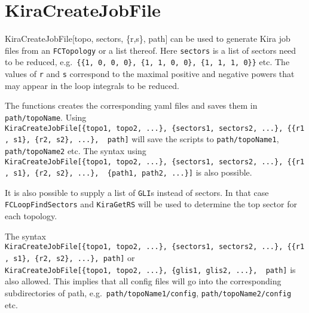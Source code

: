\documentclass[../FeynHelpersManual.tex]{subfiles}
\begin{document}
\hypertarget{kiracreatejobfile}{
\section{KiraCreateJobFile}\label{kiracreatejobfile}}

KiraCreateJobFile{[}topo, sectors, \{r,s\}, path{]} can be used to
generate Kira job files from an \texttt{FCTopology} or a list thereof.
Here \texttt{sectors} is a list of sectors need to be reduced,
e.g.~\texttt{\{\allowbreak{}\{\allowbreak{}1,\ \allowbreak{}0,\ \allowbreak{}0,\ \allowbreak{}0\},\ \allowbreak{}\{\allowbreak{}1,\ \allowbreak{}1,\ \allowbreak{}0,\ \allowbreak{}0\},\ \allowbreak{}\{\allowbreak{}1,\ \allowbreak{}1,\ \allowbreak{}1,\ \allowbreak{}0\}\}}
etc. The values of \texttt{r} and \texttt{s} correspond to the maximal
positive and negative powers that may appear in the loop integrals to be
reduced.

The functions creates the corresponding yaml files and saves them in
\texttt{path/topoName}. Using
\texttt{KiraCreateJobFile[\allowbreak{}\{\allowbreak{}topo1,\ \allowbreak{}topo2,\ \allowbreak{}...\},\ \allowbreak{}\{\allowbreak{}sectors1,\ \allowbreak{}sectors2,\ \allowbreak{}...\},\ \allowbreak{}\{\allowbreak{}\{\allowbreak{}r1,\ \allowbreak{}s1\},\ \allowbreak{}\{\allowbreak{}r2,\ \allowbreak{}s2\},\ \allowbreak{}...\},\ \allowbreak{} path]}
will save the scripts to \texttt{path/topoName1},
\texttt{path/topoName2} etc. The syntax using
\texttt{KiraCreateJobFile[\allowbreak{}\{\allowbreak{}topo1,\ \allowbreak{}topo2,\ \allowbreak{}...\},\ \allowbreak{}\{\allowbreak{}sectors1,\ \allowbreak{}sectors2,\ \allowbreak{}...\},\ \allowbreak{}\{\allowbreak{}\{\allowbreak{}r1,\ \allowbreak{}s1\},\ \allowbreak{}\{\allowbreak{}r2,\ \allowbreak{}s2\},\ \allowbreak{}...\},\ \allowbreak{} \{\allowbreak{}path1,\ \allowbreak{}path2,\ \allowbreak{}...\}]}
is also possible.

It is also possible to supply a list of \texttt{GLI}s instead of
sectors. In that case \texttt{FCLoopFindSectors} and \texttt{KiraGetRS}
will be used to determine the top sector for each topology.

The syntax
\texttt{KiraCreateJobFile[\allowbreak{}\{\allowbreak{}topo1,\ \allowbreak{}topo2,\ \allowbreak{}...\},\ \allowbreak{}\{\allowbreak{}sectors1,\ \allowbreak{}sectors2,\ \allowbreak{}...\},\ \allowbreak{}\{\allowbreak{}\{\allowbreak{}r1,\ \allowbreak{}s1\},\ \allowbreak{}\{\allowbreak{}r2,\ \allowbreak{}s2\},\ \allowbreak{}...\},\ \allowbreak{}path]}
or
\texttt{KiraCreateJobFile[\allowbreak{}\{\allowbreak{}topo1,\ \allowbreak{}topo2,\ \allowbreak{}...\},\ \allowbreak{}\{\allowbreak{}glis1,\ \allowbreak{}glis2,\ \allowbreak{}...\},\ \allowbreak{} path]}
is also allowed. This implies that all config files will go into the
corresponding subdirectories of path,
e.g.~\texttt{path/topoName1/config}, \texttt{path/topoName2/config} etc.
\end{document}
